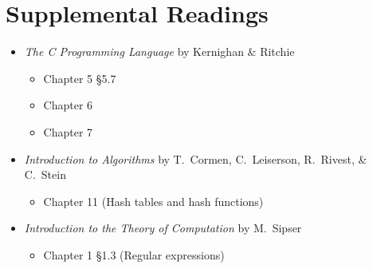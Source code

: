 \section{Supplemental Readings}

\noindent
\begin{itemize}
  \item \textit{The C Programming Language} by Kernighan \& Ritchie
  \begin{itemize}
    \item Chapter 5 \S 5.7
    \item Chapter 6
    \item Chapter 7
  \end{itemize}
  \item \textit{Introduction to Algorithms} by T.\ Cormen, C.\
    Leiserson, R.\ Rivest, \& C.\ Stein
    \begin{itemize}
      \item Chapter 11 (Hash tables and hash functions)
    \end{itemize}
  \item \textit{Introduction to the Theory of Computation} by M.\ Sipser
    \begin{itemize}
      \item Chapter 1 \S 1.3 (Regular expressions)
    \end{itemize}
\end{itemize}
